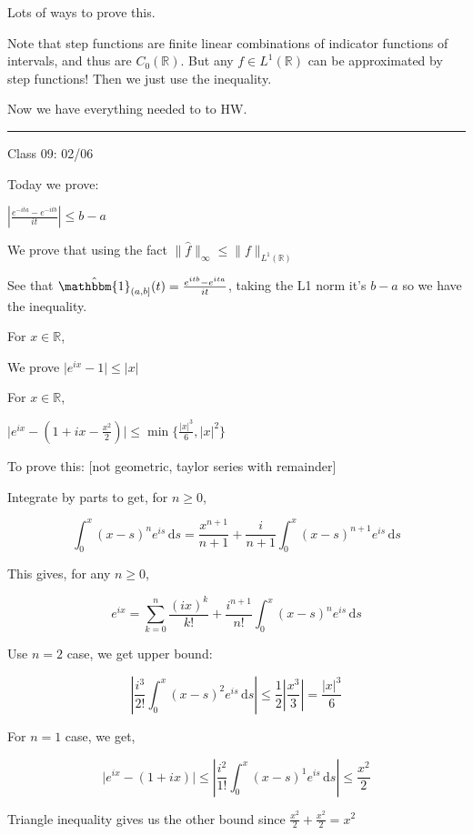 \documentclass{article}
\theoremstyle{definition}
\begin{document}
Lots of ways to prove this.

Note that step functions are finite linear combinations of indicator functions of intervals, and thus are \(C_0(\mathbb{R})\). But any \(f\in L^1(\mathbb{R})\) can be approximated by step functions! Then we just use the inequality.

Now we have everything needed to to HW.

\hfil
\hrule

Class 09: 02/06

Today we prove:

\(\left\vert \frac{e^{-ita}-e^{-itb}}{it} \right\vert \leq b - a\) 

We prove that using the fact \(\lVert \hat{f}  \rVert _\infty \leq \lVert f \rVert _{L^1(\mathbb{R})}\) 

See that \(\hat{\mathbbm{1}}_{(a,b]}(t)=\frac{e^{itb}-e^{ita}}{it}\), taking the L1 norm it's \(b-a\) so we have the inequality.

For \(x\in\mathbb{R}\),

We prove \(\vert e^{ix} - 1 \vert \leq \vert x \vert \) 

For \(x\in\mathbb{R}\),

\(\vert e^{ix} - (1 + ix - \frac{x^2}{2}) \vert \leq \min \{ \frac{\vert x \vert ^3}{6}, \vert x \vert ^2 \} \) 

To prove this: [not geometric, taylor series with remainder]

Integrate by parts to get, for \(n\geq 0\),

\[
    \int_{0}^{x} (x-s)^n e^{is}  \,\mathrm{d}s = \frac{x^{n+1}}{n+1} + \frac{i}{n+1}\int_{0}^{x} (x-s)^{n+1} e^{is} \,\mathrm{d}s 
\]

This gives, for any \(n\geq 0\),

\[
    e^{ix} = \sum_{k=0}^{n} \frac{(ix)^k}{k!} + \frac{i^{n+1}}{n!}\int_{0}^{x} (x-s)^n e^{is}  \,\mathrm{d}s 
\]

Use \(n=2\) case, we get upper bound:

\[
    \left\vert \frac{i^3}{2!} \int_{0}^{x} (x-s)^2 e^{is} \,\mathrm{d}s  \right\vert \leq \frac{1}{2} \left\vert \frac{x^3}{3} \right\vert =\frac{\vert x \vert^3 }{6}
\]

For \(n=1\) case, we get,

\[
    \vert e^{ix}-(1+ix) \vert \leq \left\vert \frac{i^2}{1!}\int_{0}^{x} (x-s)^1 e^{is} \,\mathrm{d}s  \right\vert \leq \frac{x^2}{2}
\]

Triangle inequality gives us the other bound since \(\frac{x^2}{2}+\frac{x^2}{2}=x^2\) 
\end{document}
